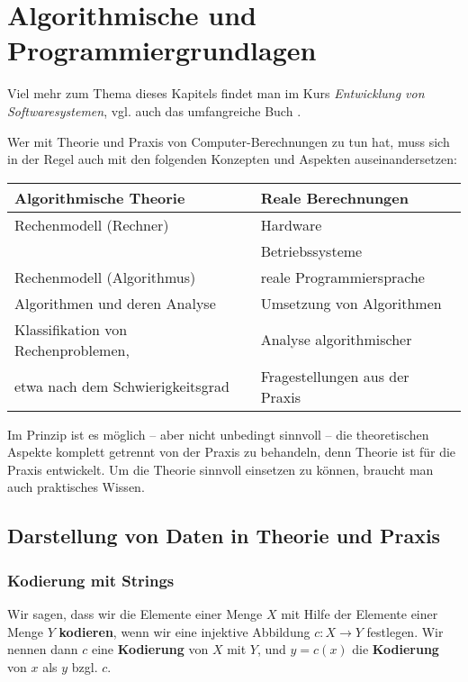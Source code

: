\chapter{Algorithmische und Programmiergrundlagen}


\begin{bem} 
Viel mehr zum Thema dieses Kapitels findet man im Kurs \emph{Entwicklung von Softwaresystemen}, vgl. auch das umfangreiche Buch \cite{GS11}. 
\end{bem} 

\begin{bem} Wer mit Theorie und Praxis von Computer-Berechnungen zu tun hat, muss sich in der Regel auch mit den folgenden Konzepten und Aspekten auseinandersetzen: 
	\begin{center} 
			\begin{tabular}{l|l} 
				\textbf{Algorithmische Theorie} & \textbf{Reale Berechnungen}
				\\ \hline\hline 
				Rechenmodell (Rechner) & Hardware 
				\\  & Betriebssysteme 
				\\  Rechenmodell (Algorithmus) & reale Programmiersprache 
				\\ \hline Algorithmen und deren Analyse & Umsetzung von Algorithmen
				\\ \hline Klassifikation von Rechenproblemen, & Analyse algorithmischer 
				\\ etwa nach dem Schwierigkeitsgrad  & Fragestellungen aus der Praxis 
			\end{tabular} 
	\end{center} 
	Im Prinzip ist es möglich -- aber nicht unbedingt sinnvoll -- die theoretischen Aspekte komplett getrennt von der Praxis zu behandeln, denn Theorie ist für die Praxis entwickelt. Um die Theorie sinnvoll einsetzen zu können, braucht man auch praktisches Wissen. 
\end{bem} 

\section{Darstellung von Daten in Theorie und Praxis} 

\subsection{Kodierung mit Strings} 

\begin{defn}
Wir sagen, dass wir die Elemente einer Menge $X$ mit Hilfe der Elemente einer Menge $Y$ \textbf{kodieren}, wenn wir eine  injektive Abbildung $c : X \to Y$ festlegen. Wir nennen dann $c$ eine \textbf{Kodierung} von $X$ mit $Y$, und $y=c(x)$ die \textbf{Kodierung} von $x$ als $y$ bzgl. $c$.  
\end{defn}

